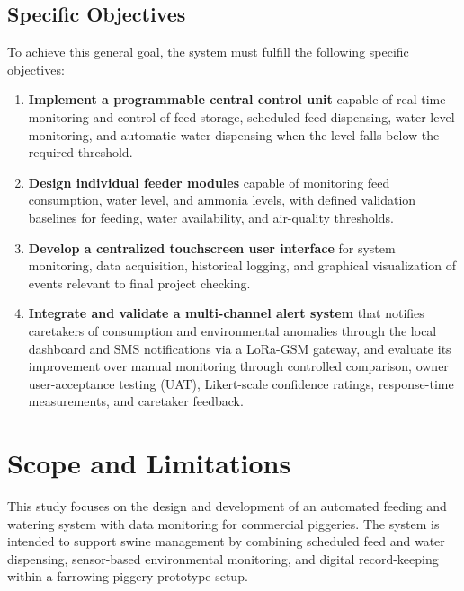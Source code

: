 \subsection{Specific Objectives}
To achieve this general goal, the system must fulfill the following specific objectives:
\begin{enumerate}[label=\arabic*.]
  \item \textbf{Implement a programmable central control unit} capable of real-time monitoring and control of feed storage, scheduled feed dispensing, water level monitoring, and automatic water dispensing when the level falls below the required threshold.
  \item \textbf{Design individual feeder modules} capable of monitoring feed consumption, water level, and ammonia levels, with defined validation baselines for feeding, water availability, and air-quality thresholds.
  \item \textbf{Develop a centralized touchscreen user interface} for system monitoring, data acquisition, historical logging, and graphical visualization of events relevant to final project checking.
  \item \textbf{Integrate and validate a multi-channel alert system} that notifies caretakers of consumption and environmental anomalies through the local dashboard and SMS notifications via a LoRa-GSM gateway, and evaluate its improvement over manual monitoring through controlled comparison, owner user-acceptance testing (UAT), Likert-scale confidence ratings, response-time measurements, and caretaker feedback.
\end{enumerate}


\section{Scope and Limitations}

This study focuses on the design and development of an automated feeding and watering system with data monitoring for commercial piggeries. The system is intended to support swine management by combining scheduled feed and water dispensing, sensor-based environmental monitoring, and digital record-keeping within a farrowing piggery prototype setup.

